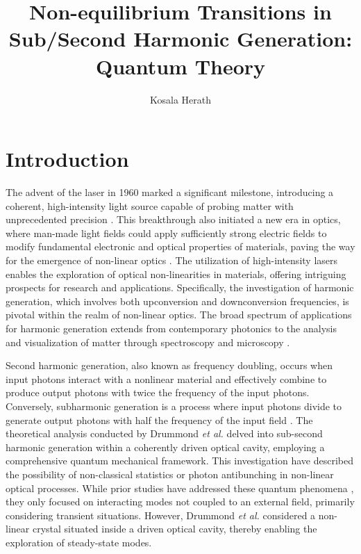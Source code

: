 \documentclass[fleqn,11pt]{wlscirep}
\title{Non-equilibrium Transitions in Sub/Second Harmonic Generation: Quantum Theory}
\author[1,*]{Kosala Herath}
\affil[1]{Advanced Computing and Simulation Laboratory (A$\chi$L), Department of Electrical and Computer Systems Engineering, Monash University, Clayton, Victoria 3800, Australia}
\affil[*]{kosala.herath@monash.edu}
\begin{document}
\flushbottom
\maketitle

\thispagestyle{empty}

\section*{Introduction}

The advent of the laser in 1960 \cite{maiman1960} marked a significant milestone, introducing a coherent, high-intensity light source capable of probing matter with unprecedented precision \cite{franken1963}. This breakthrough also initiated a new era in optics, where man-made light fields could apply sufficiently strong electric fields to modify fundamental electronic and optical properties of materials, paving the way for the emergence of non-linear optics \cite{bloembergen2000}.
The utilization of high-intensity lasers enables the exploration of optical non-linearities in materials, offering intriguing prospects for research and applications. Specifically, the investigation of harmonic generation, which involves both upconversion and downconversion frequencies, is pivotal within the realm of non-linear optics. The broad spectrum of applications for harmonic generation extends from contemporary photonics to the analysis and visualization of matter through spectroscopy and microscopy \cite{saleh2019,levenson2012,campagnola2002}.

Second harmonic generation, also known as frequency doubling, occurs when input photons interact with a nonlinear material and effectively combine to produce output photons with twice the frequency of the input photons. Conversely, subharmonic generation is a process where input photons divide to generate output photons with half the frequency of the input field \cite{franken1963,wang2023}. The theoretical analysis conducted by Drummond \textit{et al.} \cite{drummond1981} delved into sub-second harmonic generation within a coherently driven optical cavity, employing a comprehensive quantum mechanical framework. This investigation have described the possibility of non-classical statistics or photon antibunching in non-linear optical processes. While prior studies have addressed these quantum phenomena \cite{stoler1974,mostowski1978}, they  only focused on interacting modes not coupled to an external field, primarily considering transient situations. However, Drummond \textit{et al.} \cite{drummond1981} considered a non-linear crystal situated inside a driven optical cavity, thereby enabling the exploration of steady-state modes.
\end{document}
